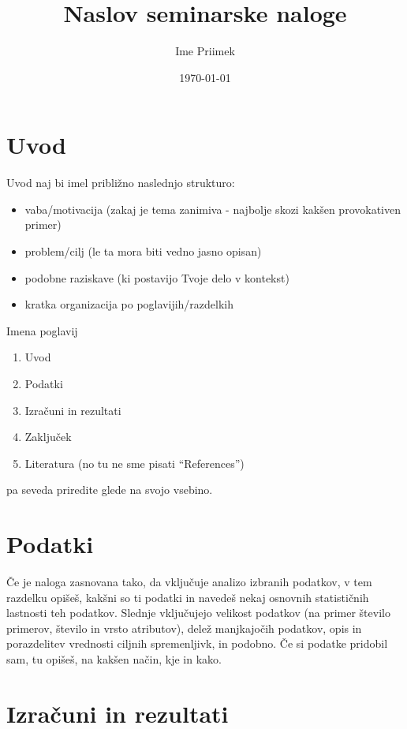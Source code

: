 \documentclass[a4paper,11pt]{article}
\title{Naslov seminarske naloge}
\author{Ime Priimek} %
\date{\today}
\begin{document}
\maketitle

\section{Uvod}


Uvod naj bi imel približno naslednjo strukturo:
\begin{itemize}
\item vaba/motivacija (zakaj je tema zanimiva - najbolje skozi
      kakšen provokativen primer)
\item problem/cilj (le ta mora biti vedno jasno opisan)
\item podobne raziskave (ki postavijo Tvoje delo v kontekst)
\item kratka organizacija po poglavijih/razdelkih 
\end{itemize}
%
Imena poglavij 
\begin{enumerate}
\item Uvod
\item Podatki
\item Izračuni in rezultati
\item Zaključek
\item Literatura (no tu ne sme pisati ``References'')
\end{enumerate}
pa seveda priredite glede na svojo vsebino.


\section{Podatki}

Če je naloga zasnovana tako, da vključuje analizo izbranih podatkov, v
tem razdelku opišeš, kakšni so ti podatki in navedeš nekaj osnovnih
statističnih lastnosti teh podatkov. Slednje vključujejo velikost
podatkov (na primer število primerov, število in vrsto atributov), delež
manjkajočih podatkov, opis in porazdelitev vrednosti ciljnih
spremenljivk, in podobno. Če si podatke pridobil sam, tu opišeš, na
kakšen način, kje in kako.

\section{Izračuni in rezultati}
\end{document}
